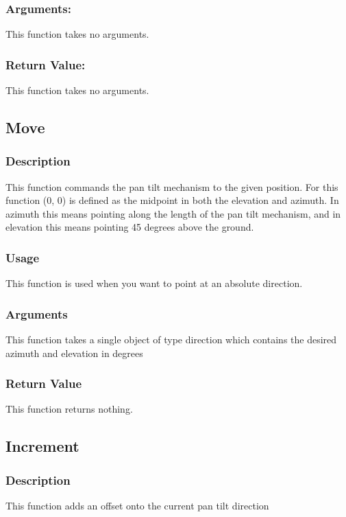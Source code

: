 \documentclass[]{report}
\begin{document}
\subsubsection{Arguments:}
This function takes no arguments.

\subsubsection{Return Value:}
This function takes no arguments.

\subsection{Move}
\subsubsection{Description}
This function commands the pan tilt mechanism to the given position. For this function (0, 0) is defined as the midpoint in both the elevation and azimuth. In azimuth this means pointing along the length of the pan tilt mechanism, and in elevation this means pointing 45 degrees above the ground.

\subsubsection{Usage}
This function is used when you want to point at an absolute direction.

\subsubsection{Arguments}
This function takes a single object of type direction which contains the desired azimuth and elevation in degrees

\subsubsection{Return Value}
This function returns nothing.

\subsection{Increment}
\subsubsection{Description}
This function adds an offset onto the current pan tilt direction
\end{document}
